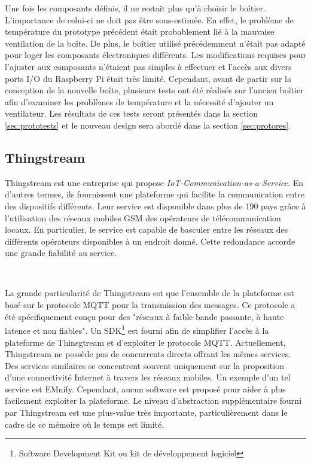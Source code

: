 Une fois les composants définis, il ne restait plus qu'à choisir le boîtier. L'importance de celui-ci ne doit pas être sous-estimée. En effet, le problème de température du prototype précédent était probablement lié à la mauvaise ventilation de la boîte. De plus, le boîtier utilisé précédemment n'était pas adapté pour loger les composants électroniques différents. Les modifications requises pour l'ajuster aux composants n'étaient pas simples à effectuer et l'accès aux divers ports I/O du Raspberry Pi était très limité. Cependant, avant de partir sur la conception de la nouvelle boîte, plusieurs tests ont été réalisés sur l'ancien boîtier afin d'examiner les problèmes de température et la nécessité d'ajouter un ventilateur. Les résultats de ces tests seront présentés dans la section \ref{sec:prototests} et le nouveau design sera abordé dans la section \ref{sec:protores}.

\subsection{Thingstream}
\label{sec:thingstream}

Thingstream est une entreprise qui propose \textit{IoT-Communication-as-a-Service}. En d’autres termes, ils fournissent une plateforme qui facilite la communication entre des dispositifs différents. Leur service est disponible dans plus de 190 pays grâce à l’utilisation des réseaux mobiles GSM des opérateurs de télécommunication locaux. En particulier, le service est capable de basculer entre les réseaux des différents opérateurs disponibles à un endroit donné. Cette redondance accorde une grande fiabilité au service.

~

\noindent
La grande particularité de Thingstream est que l’ensemble de la plateforme est basé sur le protocole MQTT pour la transmission des messages. Ce protocole a été spécifiquement conçu pour des "réseaux à faible bande passante, à haute latence et non fiables"\cite{mqtt_faq}. Un SDK\footnote{Software Development Kit ou kit de développement logiciel} est fourni afin de simplifier l’accès à la plateforme de Thinsgtream et d’exploiter le protocole MQTT. Actuellement, Thingstream ne possède pas de concurrents directs offrant les mêmes services. Des services similaires se concentrent souvent uniquement sur la proposition d’une connectivité Internet à travers les réseaux mobiles. Un exemple d’un tel service est EMnify. Cependant, aucun software est proposé pour aider à plus facilement exploiter la plateforme. Le niveau d’abstraction supplémentaire fourni par Thingstream est une plus-value très importante, particulièrement dans le cadre de ce mémoire où le temps est limité.

